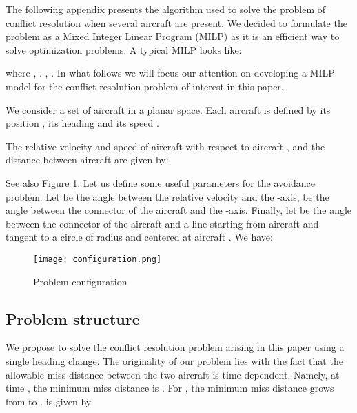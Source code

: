 \documentclass[a4paper, 10pt]{IEEEtran}
\renewcommand{\thetable}{\arabic{table}}
\begin{document}
 \renewcommand{\theequation}{A-\arabic{equation}}
\setcounter{equation}{0}  \renewcommand{\thefigure}{A-\arabic{figure}}
\setcounter{figure}{0}  \renewcommand{\thetable}{A-\arabic{table}}
\setcounter{table}{0}  



The following appendix presents the algorithm used to solve the problem of conflict resolution when several aircraft are present. We decided to formulate the problem as a Mixed Integer Linear Program (MILP) as it is an efficient way to solve optimization problems. 
A typical MILP looks like:

where , .  , . In what follows we will focus our attention on developing a MILP model for the conflict resolution problem of interest in this paper. 



We consider a set of  aircraft in a planar space. Each aircraft  is defined by its position , its heading  and its  speed .

The relative velocity   and speed   of aircraft  with respect to aircraft , and the distance  between aircraft are given by:

See also Figure \ref{fig:configuration}. Let us define some useful parameters for the avoidance problem.
Let  be the angle between the relative velocity  and the -axis,  be the angle between the connector of the aircraft and the -axis. Finally, let  be the angle between the connector of the aircraft and a line starting from aircraft  and tangent to a circle of radius  and centered at aircraft . We have:

 \begin{figure}[ht]
\centering
 \texttt{[image: configuration.png]}
\caption{Problem configuration}\label{fig:configuration}
\end{figure}









\subsection{Problem structure}
We propose to solve the conflict resolution problem arising in this paper using a single heading change.  The originality of our problem lies with the fact that the allowable  miss distance between the two aircraft is time-dependent. Namely, at time , the minimum miss distance is . For , the minimum miss distance grows from  to .  is given by
\end{document}
